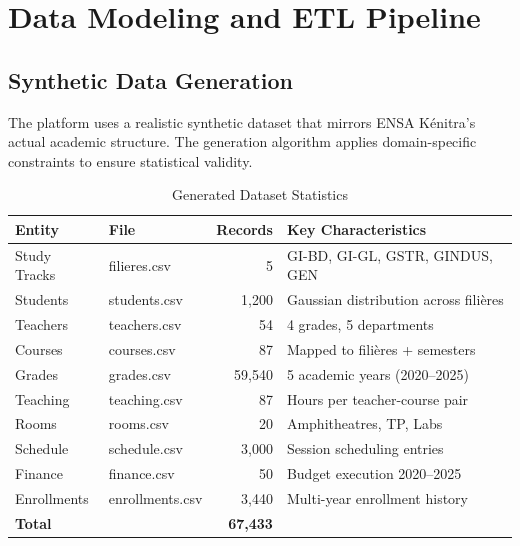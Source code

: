 \documentclass[12pt, a4paper]{report}
\begin{document}
\chapter{Data Modeling and ETL Pipeline}

\section{Synthetic Data Generation}

The platform uses a realistic synthetic dataset that mirrors ENSA Kénitra's actual academic structure. The generation algorithm applies domain-specific constraints to ensure statistical validity.

\begin{table}[H]
\centering
\caption{Generated Dataset Statistics}
\label{tab:dataset}
\begin{tabular}{@{}llrp{6cm}@{}}
\toprule
\textbf{Entity} & \textbf{File} & \textbf{Records} & \textbf{Key Characteristics} \\
\midrule
Study Tracks  & filieres.csv     & 5      & GI-BD, GI-GL, GSTR, GINDUS, GEN \\
Students      & students.csv     & 1,200  & Gaussian distribution across filières \\
Teachers      & teachers.csv     & 54     & 4 grades, 5 departments \\
Courses       & courses.csv      & 87     & Mapped to filières + semesters \\
Grades        & grades.csv       & 59,540 & 5 academic years (2020--2025) \\
Teaching      & teaching.csv     & 87     & Hours per teacher-course pair \\
Rooms         & rooms.csv        & 20     & Amphitheatres, TP, Labs \\
Schedule      & schedule.csv     & 3,000  & Session scheduling entries \\
Finance       & finance.csv      & 50     & Budget execution 2020--2025 \\
Enrollments   & enrollments.csv  & 3,440  & Multi-year enrollment history \\
\midrule
\textbf{Total} & & \textbf{67,433} & \\
\bottomrule
\end{tabular}
\end{table}
\end{document}
